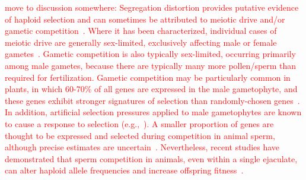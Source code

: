 \documentclass[10pt,letterpaper]{article}
\begin{document}
\textcolor{red}{move to discussion somewhere:
Segregation distortion provides putative evidence of haploid selection and can sometimes be attributed to meiotic drive and/or gametic competition~\cite{Lalanne2004,Fishman2005,Leppala2008,Leppala2013,Didion2015,Didion2016}.
Where it has been characterized, individual cases of meiotic drive are generally sex-limited, exclusively affecting male or female gametes~\cite{Ubeda:2005gw,Lindholm:2016cw}.
Gametic competition is also typically sex-limited, occurring primarily among male gametes, because there are typically many more pollen/sperm than required for fertilization.
Gametic competition may be particularly common in plants, in which 60-70\% of all genes are expressed in the male gametophyte, and these genes exhibit stronger signatures of selection than randomly-chosen genes~\cite{Borg:2009jpa,Arunkumar:2013iq,Gossmann:2014dua}.
In addition, artificial selection pressures applied to male gametophytes are known to cause a response to selection (e.g.,~\cite{Hormaza:1996cv,Ravikumar:2003uo,Hedhly:2004iv,Clarke:2004ir}). 
A smaller proportion of genes are thought to be expressed and selected during competition in animal sperm, although precise estimates are uncertain~\cite{Zheng:2001fi,JOSEPH:2004haa,Vibranovski:2010et}. 
Nevertheless, recent studies have demonstrated that sperm competition in animals, even within a single ejaculate, can alter haploid allele frequencies and increase offspring fitness~\cite{Immler:2014im,Alavioon2017}.
}
\end{document}

